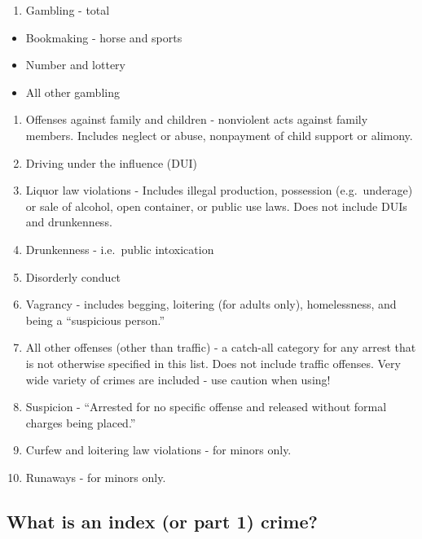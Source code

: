 \documentclass[
  12pt,
  openany]{book}
\providecommand{\tightlist}{%
  \setlength{\itemsep}{0pt}\setlength{\parskip}{0pt}}
\begin{document}
\begin{enumerate}
\def\labelenumi{\arabic{enumi}.}
\setcounter{enumi}{18}
\tightlist
\item
  Gambling - total
\end{enumerate}

\begin{itemize}
\tightlist
\item
  Bookmaking - horse and sports
\item
  Number and lottery
\item
  All other gambling
\end{itemize}

\begin{enumerate}
\def\labelenumi{\arabic{enumi}.}
\setcounter{enumi}{19}
\tightlist
\item
  Offenses against family and children - nonviolent acts against family members. Includes neglect or abuse, nonpayment of child support or alimony.
\item
  Driving under the influence (DUI)
\item
  Liquor law violations - Includes illegal production, possession (e.g.~underage) or sale of alcohol, open container, or public use laws. Does not include DUIs and drunkenness.
\item
  Drunkenness - i.e.~public intoxication
\item
  Disorderly conduct
\item
  Vagrancy - includes begging, loitering (for adults only), homelessness, and being a ``suspicious person.''
\item
  All other offenses (other than traffic) - a catch-all category for any arrest that is not otherwise specified in this list. Does not include traffic offenses. Very wide variety of crimes are included - use caution when using!
\item
  Suspicion - ``Arrested for no specific offense and released without formal charges being placed.''
\item
  Curfew and loitering law violations - for minors only.
\item
  Runaways - for minors only.
\end{enumerate}

\hypertarget{indexCrimes}{%
\subsection{What is an index (or part 1) crime?}\label{indexCrimes}}
\end{document}
